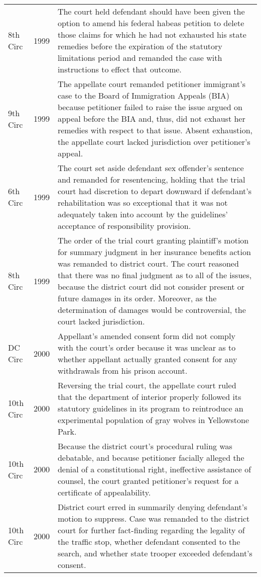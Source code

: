 \documentclass[10pt, letterpaper]{article}
\begin{document}
\begin{spacing}{1.0}
\begin{small}
\begin{longtable}[H]{llp{5in}}
    8th Circ & 1999 & The court held defendant should have been given the option to amend his federal habeas petition to delete those claims for which he had not exhausted his state remedies before the expiration of the statutory limitations period and remanded the case with instructions to effect that outcome.\\[4pt]
    9th Circ & 1999 & The appellate court remanded petitioner immigrant's case to the Board of Immigration Appeals (BIA) because petitioner failed to raise the issue argued on appeal before the BIA and, thus, did not exhaust her remedies with respect to that issue. Absent exhaustion, the appellate court lacked jurisdiction over petitioner's appeal.\\[4pt]
    6th Circ & 1999 & The court set aside defendant sex offender's sentence and remanded for resentencing, holding that the trial court had discretion to depart downward if defendant's rehabilitation was so exceptional that it was not adequately taken into account by the guidelines' acceptance of responsibility provision.\\[4pt]
    8th Circ & 1999 & The order of the trial court granting plaintiff's motion for summary judgment in her insurance benefits action was remanded to district court. The court reasoned that there was no final judgment as to all of the issues, because the district court did not consider present or future damages in its order. Moreover, as the determination of damages would be controversial, the court lacked jurisdiction.\\[4pt]
    DC Circ & 2000 & Appellant's amended consent form did not comply with the court's order because it was unclear as to whether appellant actually granted consent for any withdrawals from his prison account.\\[4pt]
    10th Circ & 2000 & Reversing the trial court, the appellate court ruled that the department of interior properly followed its statutory guidelines in its program to reintroduce an experimental population of gray wolves in Yellowstone Park.\\[4pt]
    10th Circ & 2000 & Because the district court's procedural ruling was debatable, and because petitioner facially alleged the denial of a constitutional right, ineffective assistance of counsel, the court granted petitioner's request for a certificate of appealability.\\[4pt]
    10th Circ & 2000 & District court erred in summarily denying defendant's motion to suppress. Case was remanded to the district court for further fact-finding regarding the legality of the traffic stop, whether defendant consented to the search, and whether state trooper exceeded defendant's consent.\\[4pt]

\end{longtable}
\end{small}
\end{spacing}
\end{document}
